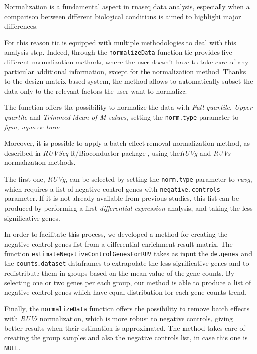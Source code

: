 Normalization is a fundamental aspect in \gls{rnaseq} data analysis, especially when a comparison between different biological conditions is aimed to highlight major differences.

For this reason \gls{tic} is equipped with multiple methodologies to deal with this analysis step. 
Indeed, through the \lstinline!normalizeData! function \gls{tic} provides five different normalization methods, where the user doesn't have to take care of any particular additional information, except for the normalization method.
Thanks to the design matrix based system, the method allows to automatically subset the data only to the relevant factors the user want to normalize.

The function offers the possibility to normalize the data with \textit{Full quantile}, \textit{Upper quartile} and \textit{Trimmed Mean of M-values}, setting the \lstinline!norm.type! parameter to \textit{fqua}, \textit{uqua} or \textit{tmm}.

Moreover, it is possible to apply a batch effect removal normalization method, as described in \textit{RUVSeq} R/Bioconductor package \cite{Risso2014h}, using the\textit{RUVg} and \textit{RUVs} normalization methods.

The first one, \textit{RUVg}, can be selected by setting the \lstinline!norm.type! parameter to \textit{ruvg}, which requires a list of negative control genes with \lstinline!negative.controls! parameter.
If it is not already available from previous studies, this list can be produced by performing a first \textit{differential expression} analysis, and taking the less significative genes.

In order to facilitate this process, we developed a method for creating the negative control genes list from a differential enrichment result matrix.
The function \lstinline!estimateNegativeControlGenesForRUV! takes as input the \lstinline!de.genes! and the \lstinline!counts.dataset! dataframes to extrapolate the less significative genes and to redistribute them in groups based on the mean value of the gene counts.
By selecting one or two genes per each group, our method is able to produce a list of negative control genes which have equal distribution for each gene counts trend.

Finally, the \lstinline!normalizeData! function offers the possibility to remove batch effects with \textit{RUVs} normalization, which is more robust to negative controls, giving better results when their estimation is approximated.
The method takes care of creating the group samples and also the negative controls list, in case this one is \lstinline!NULL!.
